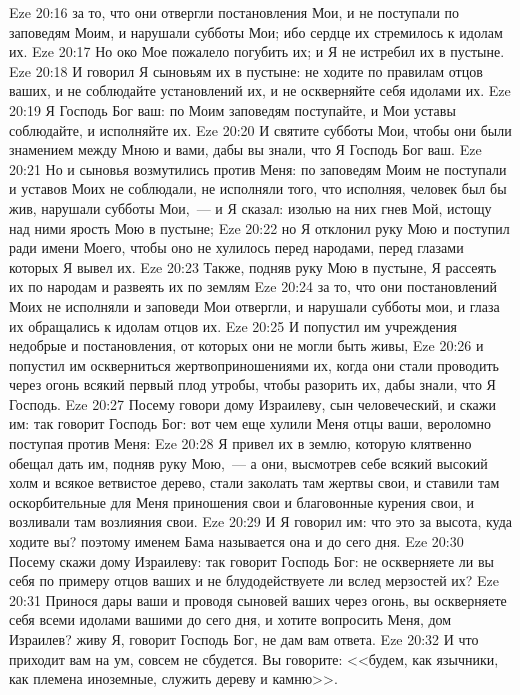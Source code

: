 \vs Eze 20:16 за то, что они отвергли постановления Мои, и не поступали по заповедям Моим, и нарушали субботы Мои; ибо сердце их стремилось к идолам их.
\vs Eze 20:17 Но око Мое пожалело погубить их; и Я не истребил их в пустыне.
\vs Eze 20:18 И говорил Я сыновьям их в пустыне: не ходите по правилам отцов ваших, и не соблюдайте установлений их, и не оскверняйте себя идолами их.
\vs Eze 20:19 Я Господь Бог ваш: по Моим заповедям поступайте, и Мои уставы соблюдайте, и исполняйте их.
\vs Eze 20:20 И святите субботы Мои, чтобы они были знамением между Мною и вами, дабы вы знали, что Я Господь Бог ваш.
\vs Eze 20:21 Но и сыновья возмутились против Меня: по заповедям Моим не поступали и уставов Моих не соблюдали, не исполняли того, что исполняя, человек был бы жив, нарушали субботы Мои,~--- и Я сказал: изолью на них гнев Мой, истощу над ними ярость Мою в пустыне;
\vs Eze 20:22 но Я отклонил руку Мою и поступил ради имени Моего, чтобы оно не хулилось перед народами, перед глазами которых Я вывел их.
\vs Eze 20:23 Также, подняв руку Мою в пустыне, Я  рассеять их по народам и развеять их по землям
\vs Eze 20:24 за то, что они постановлений Моих не исполняли и заповеди Мои отвергли, и нарушали субботы мои, и глаза их обращались к идолам отцов их.
\vs Eze 20:25 И попустил им учреждения недобрые и постановления, от которых они не могли быть живы,
\vs Eze 20:26 и попустил им оскверниться жертвоприношениями их, когда они стали проводить через огонь всякий первый плод утробы, чтобы разорить их, дабы знали, что Я Господь.
\vs Eze 20:27 Посему говори дому Израилеву, сын человеческий, и скажи им: так говорит Господь Бог: вот чем еще хулили Меня отцы ваши, вероломно поступая против Меня:
\vs Eze 20:28 Я привел их в землю, которую клятвенно обещал дать им, подняв руку Мою,~--- а они, высмотрев себе всякий высокий холм и всякое ветвистое дерево, стали заколать там жертвы свои, и ставили там оскорбительные для Меня приношения свои и благовонные курения свои, и возливали там возлияния свои.
\vs Eze 20:29 И Я говорил им: что это за высота, куда ходите вы? поэтому именем Бама называется она и до сего дня.
\vs Eze 20:30 Посему скажи дому Израилеву: так говорит Господь Бог: не оскверняете ли вы себя по примеру отцов ваших и не блудодействуете ли вслед мерзостей их?
\vs Eze 20:31 Принося дары ваши и проводя сыновей ваших через огонь, вы оскверняете себя всеми идолами вашими до сего дня, и хотите вопросить Меня, дом Израилев? живу Я, говорит Господь Бог, не дам вам ответа.
\vs Eze 20:32 И что приходит вам на ум, совсем не сбудется. Вы говорите: <<будем, как язычники, как племена иноземные, служить дереву и камню>>.

